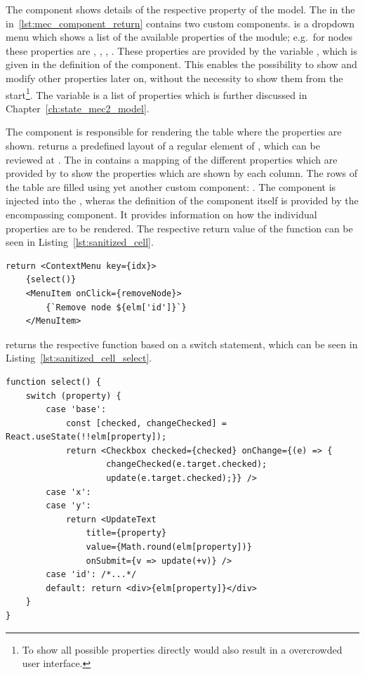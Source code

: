The  component shows details of the respective property of the  model.
The  in the  in~\ref{lst:mec_component_return} contains two custom components.
 is a dropdown menu which shows a list of the available properties of the module; e.g.\ for nodes these properties are , , , .
These properties are provided by the variable , which is given in the definition of the component.
This enables the possibility to show and modify other properties later on, without the necessity to show them from the start\footnote{To show all possible properties directly would also result in a overcrowded user interface.}.
The  variable is a list of properties which is further discussed in Chapter~\ref{ch:state_mec2_model}.

The  component is responsible for rendering the table where the properties are shown.
 returns a predefined layout of a regular  element of , which can be reviewed at .
The  in  contains a mapping of the different properties which are provided by  to show the properties which are shown by each column.
The rows of the table are filled using yet another custom component: .
The  component is injected into the , wheras the definition of the component itself is provided by the encompassing component.
It provides information on how the individual properties are to be rendered.
The respective return value of the  function can be seen in Listing~\ref{lst:sanitized_cell}.

\begin{lstlisting}[label={lst:sanitized_cell}, caption={Return statement of the \code{Node} components \code{SanitizedCell} function.}]
return <ContextMenu key={idx}>
    {select()}
    <MenuItem onClick={removeNode}>
        {`Remove node ${elm['id']}`}
    </MenuItem>
\end{lstlisting}

 returns the respective function based on a switch statement, which can be seen in Listing~\ref{lst:sanitized_cell_select}.

\begin{lstlisting}[label={lst:sanitized_cell_select}, caption={\code{select} function in \code{SanitizedCell} of the \code{Node} component.}]
function select() {
    switch (property) {
        case 'base':
            const [checked, changeChecked] = React.useState(!!elm[property]);
            return <Checkbox checked={checked} onChange={(e) => {
                    changeChecked(e.target.checked);
                    update(e.target.checked);}} />
        case 'x':
        case 'y':
            return <UpdateText
                title={property}
                value={Math.round(elm[property])}
                onSubmit={v => update(+v)} />
        case 'id': /*...*/
        default: return <div>{elm[property]}</div>
    }
}
\end{lstlisting}

